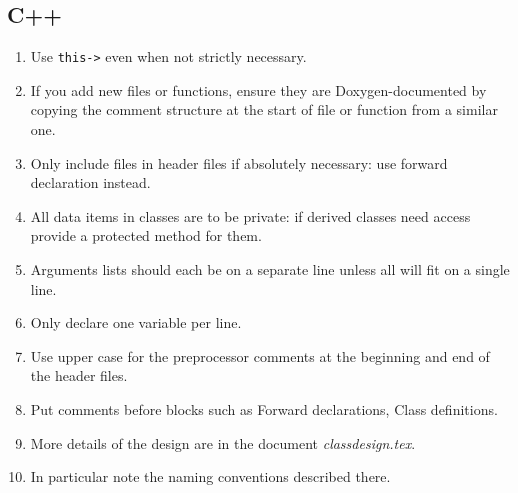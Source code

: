 \documentclass[12pt, a4paper]{article}
\renewcommand{\=}{\,=\,}
\newcommand{\+}{\,+\,}
\begin{document}
\subsection{C++}
\begin{enumerate}
\item Use \texttt{this-\textgreater} even when not strictly necessary.
\item If you add new files or functions, ensure they are
  Doxygen-documented by copying the comment structure at the start of file or
  function from a similar one.
\item Only include files in header files if absolutely necessary: use forward
  declaration instead.
\item All data items in classes are to be private: if derived classes need
  access provide a protected method for them.
\item Arguments lists should each be on a separate line unless all will fit on a
  single line.
\item Only declare one variable per line.
\item Use upper case for the preprocessor comments at the beginning and end of
  the header files.
\item Put comments before blocks such as Forward declarations, Class
  definitions.
\item More details of the design are in the document \emph{classdesign.tex}.
\item In particular note the naming conventions described there.
\end{enumerate}
\end{document}
